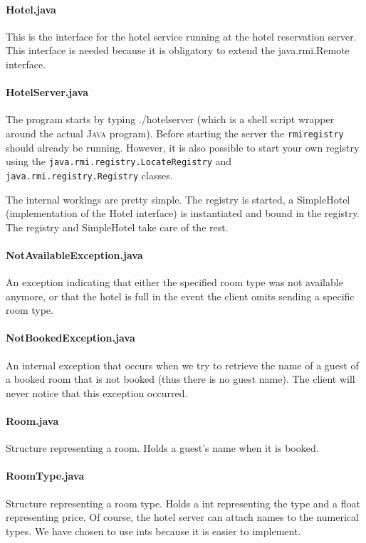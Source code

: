 \documentclass[a4paper,10pt]{article}
\begin{document}
\paragraph{Hotel.java}
This is the interface for the hotel service running at the hotel reservation server. This interface is needed because it is obligatory to extend the java.rmi.Remote interface.
 
\paragraph{HotelServer.java}
The program starts by typing ./hotelserver (which is a shell script wrapper around the actual \textsc{Java} program). Before starting the server the \texttt{rmiregistry} should already be running. However, it is also possible to start your own registry using the \texttt{java.rmi.registry.LocateRegistry} and \texttt{java.rmi.registry.Registry} classes.

The internal workings are pretty simple. The registry is started, a SimpleHotel (implementation of the Hotel interface) is instantiated and bound in the registry. The registry and SimpleHotel take care of the rest. 

\paragraph{NotAvailableException.java}
An exception indicating that either the specified room type was not available anymore, or that the hotel is full in the event the client omits sending a specific room type.

\paragraph{NotBookedException.java}
An internal exception that occurs when we try to retrieve the name of a guest of a booked room that is not booked (thus there is no guest name). The client will never notice that this exception occurred.

\paragraph{Room.java}
Structure representing a room. Holds a guest's name when it is booked.

\paragraph{RoomType.java}
Structure representing a room type. Holds a int representing the type and a float representing price. Of course, the hotel server can attach names to the numerical types. We have chosen to use ints because it is easier to implement.
\end{document}
